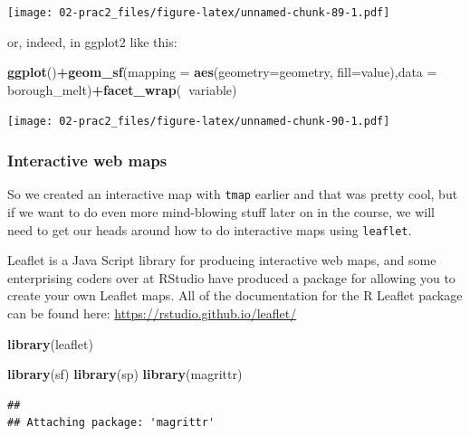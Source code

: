 \documentclass[]{book}
\newenvironment{Shaded}{\begin{snugshade}}{\end{snugshade}}
\newcommand{\DataTypeTok}[1]{\textcolor[rgb]{0.13,0.29,0.53}{#1}}
\newcommand{\KeywordTok}[1]{\textcolor[rgb]{0.13,0.29,0.53}{\textbf{#1}}}
\newcommand{\NormalTok}[1]{#1}
\newcommand{\OperatorTok}[1]{\textcolor[rgb]{0.81,0.36,0.00}{\textbf{#1}}}
\begin{document}
\texttt{[image: 02-prac2\_files/figure-latex/unnamed-chunk-89-1.pdf]}

or, indeed, in ggplot2 like this:

\begin{Shaded}
\begin{Highlighting}[]
\KeywordTok{ggplot}\NormalTok{()}\OperatorTok{+}\KeywordTok{geom_sf}\NormalTok{(}\DataTypeTok{mapping =} \KeywordTok{aes}\NormalTok{(}\DataTypeTok{geometry=}\NormalTok{geometry, }\DataTypeTok{fill=}\NormalTok{value),}\DataTypeTok{data =}\NormalTok{ borough_melt)}\OperatorTok{+}\KeywordTok{facet_wrap}\NormalTok{(}\OperatorTok{~}\NormalTok{variable)}
\end{Highlighting}
\end{Shaded}

\texttt{[image: 02-prac2\_files/figure-latex/unnamed-chunk-90-1.pdf]}

\hypertarget{interactive-web-maps}{%
\subsubsection{Interactive web maps}\label{interactive-web-maps}}

So we created an interactive map with \texttt{tmap} earlier and that was pretty cool, but if we want to do even more mind-blowing stuff later on in the course, we will need to get our heads around how to do interactive maps using \texttt{leaflet}.

Leaflet is a Java Script library for producing interactive web maps, and some enterprising coders over at RStudio have produced a package for allowing you to create your own Leaflet maps. All of the documentation for the R Leaflet package can be found here: \url{https://rstudio.github.io/leaflet/}

\begin{Shaded}
\begin{Highlighting}[]
\KeywordTok{library}\NormalTok{(leaflet)}
\end{Highlighting}
\end{Shaded}

\begin{Shaded}
\begin{Highlighting}[]
\KeywordTok{library}\NormalTok{(sf)}
\KeywordTok{library}\NormalTok{(sp)}
\KeywordTok{library}\NormalTok{(magrittr)}
\end{Highlighting}
\end{Shaded}

\begin{verbatim}
## 
## Attaching package: 'magrittr'
\end{verbatim}
\end{document}
